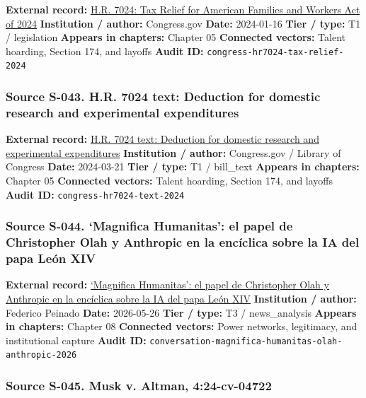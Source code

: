 \documentclass[
  american,
  11pt,
  letterpaper,
]{article}
\begin{document}
\textbf{External record:}
\href{https://www.congress.gov/bill/118th-congress/house-bill/7024}{H.R.
7024: Tax Relief for American Families and Workers Act of 2024}
\textbf{Institution / author:} Congress.gov \textbf{Date:} 2024-01-16
\textbf{Tier / type:} T1 / legislation \textbf{Appears in chapters:}
Chapter 05 \textbf{Connected vectors:} Talent hoarding, Section 174, and
layoffs \textbf{Audit ID:} \texttt{congress-hr7024-tax-relief-2024}

\subsubsection{Source S-043. H.R. 7024 text: Deduction for domestic
research and experimental
expenditures}\label{source-s-043-h-r-7024-text-deduction-for-domestic-research-and-experimental-expenditures}

\textbf{External record:}
\href{https://www.congress.gov/bill/118th-congress/house-bill/7024/text}{H.R.
7024 text: Deduction for domestic research and experimental
expenditures} \textbf{Institution / author:} Congress.gov / Library of
Congress \textbf{Date:} 2024-03-21 \textbf{Tier / type:} T1 / bill\_text
\textbf{Appears in chapters:} Chapter 05 \textbf{Connected vectors:}
Talent hoarding, Section 174, and layoffs \textbf{Audit ID:}
\texttt{congress-hr7024-text-2024}

\subsubsection{Source S-044. `Magnifica Humanitas': el papel de
Christopher Olah y Anthropic en la encíclica sobre la IA del papa León
XIV}\label{source-s-044-magnifica-humanitas-el-papel-de-christopher-olah-y-anthropic-en-la-enc-clica-sobre-la-ia-del-papa-le-n-xiv}

\textbf{External record:}
\href{https://theconversation.com/magnifica-humanitas-el-papel-de-christopher-olah-y-anthropic-en-la-enciclica-sobre-la-ia-del-papa-leon-xiv-283517}{`Magnifica
Humanitas': el papel de Christopher Olah y Anthropic en la encíclica
sobre la IA del papa León XIV} \textbf{Institution / author:} Federico
Peinado \textbf{Date:} 2026-05-26 \textbf{Tier / type:} T3 /
news\_analysis \textbf{Appears in chapters:} Chapter 08
\textbf{Connected vectors:} Power networks, legitimacy, and
institutional capture \textbf{Audit ID:}
\texttt{conversation-magnifica-humanitas-olah-anthropic-2026}

\subsubsection{Source S-045. Musk v. Altman,
4:24-cv-04722}\label{source-s-045-musk-v-altman-4-24-cv-04722}
\end{document}
